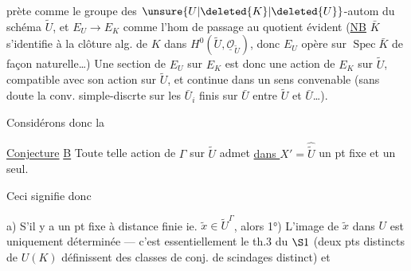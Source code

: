 prète comme le groupe  des $\unsure{U|\deleted{K}|\deleted{U}}$-autom du schéma $\widetilde U$, et $E_U\longrightarrow E_K$ comme l'hom de passage au quotient évident (\uline{NB} $\bar K$ s'identifie à la clôture alg. de $K$ dans $H^0(\widetilde U,\underline{\mathcal O}_{\widetilde U})$, donc $E_U$ opère sur $\operatorname{Spec}\bar K$ de façon naturelle\ldots) Une section de $E_U$ sur $E_K$ est donc une action de $E_K$ sur $\widetilde U$, compatible avec son action sur $\widetilde U$, et continue dans un sens convenable (sans doute la conv. simple-discrte sur les  $\bar U_i$ finis sur $\bar U$ entre $\widetilde U$ et $\bar U$\ldots).

Considérons donc la

\uline{Conjecture} \uline{B} Toute telle action de $\Gamma$ sur $\widetilde U$ admet \uline{dans $X'$}$=\widehat{\widetilde U}$ un pt fixe et un seul.

Ceci signifie donc

a) S'il y a un pt fixe à distance finie ie. $\widetilde x\in\widetilde U^\Gamma$, alors 1°) L'image de $\widetilde x$ dans $U$ est uniquement déterminée --- c'est essentiellement le th.3 du $\S1$ (deux pts distincts de $U(K)$ définissent des classes de conj. de scindages distinct) et
